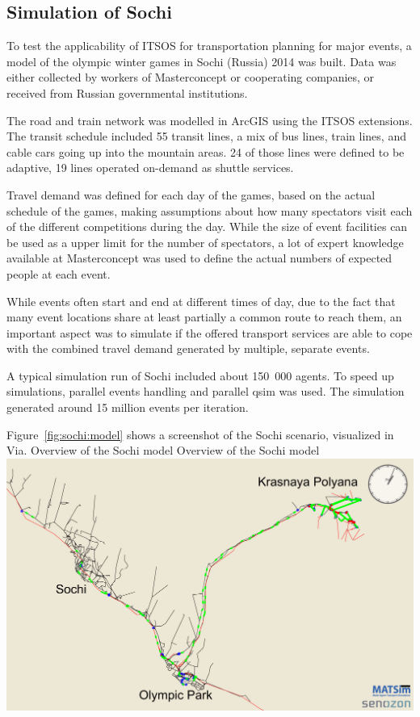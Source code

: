 \subsection{Simulation of Sochi}

To test the applicability of ITSOS for transportation planning for major events,
a model of the olympic winter games in Sochi (Russia) 2014 was built. Data was
either collected by workers of Masterconcept or cooperating companies, or
received from Russian governmental institutions.

The road and train network was modelled in ArcGIS using the ITSOS extensions.
The transit schedule included 55 transit lines, a mix of bus lines, train lines,
and cable cars going up into the mountain areas. 24 of those lines were
defined to be adaptive, 19 lines operated on-demand as shuttle services.

Travel demand was
defined for each day of the games, based on the actual schedule of the games,
making assumptions about how many spectators visit each of the different
competitions during the day. While the size of event facilities can be used as a
upper limit for the number of spectators, a lot of expert knowledge available at
Masterconcept was used to define the actual numbers of expected people at each
event.

While events often start and end at different times
of day, due to the fact that many event locations share at least partially a
common route to reach them, an important aspect was to simulate if the offered
transport services are able to cope with the combined travel demand generated
by multiple, separate events.

A typical simulation run of Sochi included about 150~000 agents. To speed up
simulations, parallel events handling and parallel qsim was used. The simulation
generated around 15 million events per iteration.

Figure~\ref{fig:sochi:model} shows a screenshot of the Sochi scenario,
visualized in Via.
%
\createfigure%
{Overview of the Sochi model}%
{Overview of the Sochi model}%
{\label{fig:sochi:model}}%
{\includegraphics[width=1.\textwidth,angle=0]{./using/figures/sochi_full.pdf}}%
{}
%

